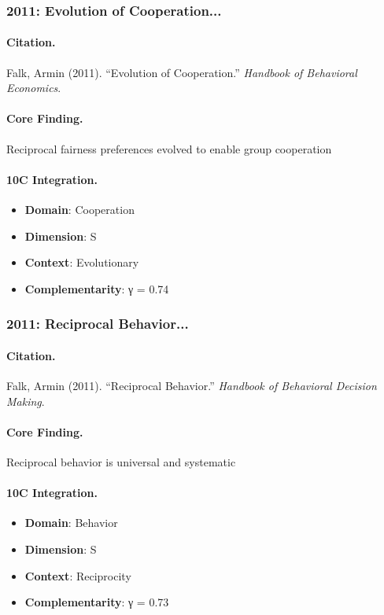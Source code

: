 \subsubsection{2011: Evolution of Cooperation...}

\paragraph{Citation.}
Falk, Armin (2011). ``Evolution of Cooperation.''
\textit{Handbook of Behavioral Economics}.

\paragraph{Core Finding.}
Reciprocal fairness preferences evolved to enable group cooperation

\paragraph{10C Integration.}
\begin{itemize}[nosep]
  \item \textbf{Domain}: Cooperation
  \item \textbf{Dimension}: S
  \item \textbf{Context}: Evolutionary
  \item \textbf{Complementarity}: γ = 0.74
\end{itemize}


\subsubsection{2011: Reciprocal Behavior...}

\paragraph{Citation.}
Falk, Armin (2011). ``Reciprocal Behavior.''
\textit{Handbook of Behavioral Decision Making}.

\paragraph{Core Finding.}
Reciprocal behavior is universal and systematic

\paragraph{10C Integration.}
\begin{itemize}[nosep]
  \item \textbf{Domain}: Behavior
  \item \textbf{Dimension}: S
  \item \textbf{Context}: Reciprocity
  \item \textbf{Complementarity}: γ = 0.73
\end{itemize}


